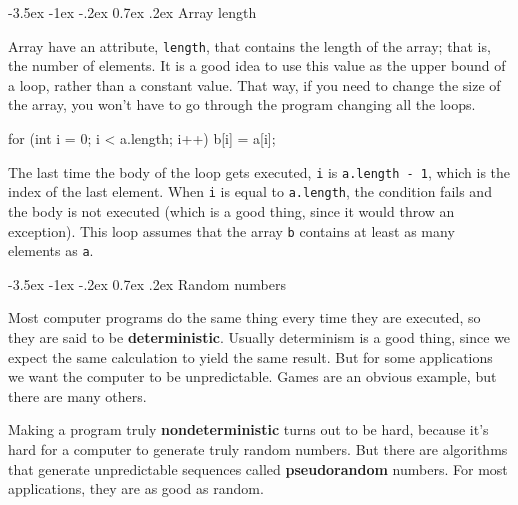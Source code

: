 \documentclass[12pt]{book}
\makeatletter
\theoremstyle{exercise}
\newcommand{\java}[1]{\verb"#1"}
\renewcommand{\section}{\@startsection{section}{1}{\z@}%
    {-3.5ex \@plus -1ex \@minus -.2ex}%
    {0.7ex \@plus.2ex}%
    {\normalfont\Large\bfseries}}
\newcommand{\java}[1]{\lstinline{#1}} %
\makeatother
\begin{document}
\section{Array length}


Array have an attribute, \java{length}, that contains the length of the array; that is, the number of elements.
It is a good idea to use this value as the upper bound of a loop, rather than a constant value.
That way, if you need to change the size of the array, you won't have to go through the program changing all the loops.

\begin{code}
    for (int i = 0; i < a.length; i++) {
        b[i] = a[i];
    }
\end{code}

The last time the body of the loop gets executed, \java{i} is \java{a.length - 1}, which is the index of the last element.
When \java{i} is equal to \java{a.length}, the condition fails and the body is not executed (which is a good thing, since it would throw an exception).
This loop assumes that the array \java{b} contains at least as many elements as \java{a}.




\section{Random numbers}
\label{random}
\label{pseudorandom}


Most computer programs do the same thing every time they are executed, so they are said to be {\bf deterministic}.
Usually determinism is a good thing, since we expect the same calculation to yield the same result.
But for some applications we want the computer to be unpredictable.
Games are an obvious example, but there are many others.


Making a program truly {\bf nondeterministic} turns out to be hard, because it's hard for a computer to generate truly random numbers.
But there are algorithms that generate unpredictable sequences called {\bf pseudorandom} numbers.
For most applications, they are as good as random.
\end{document}
